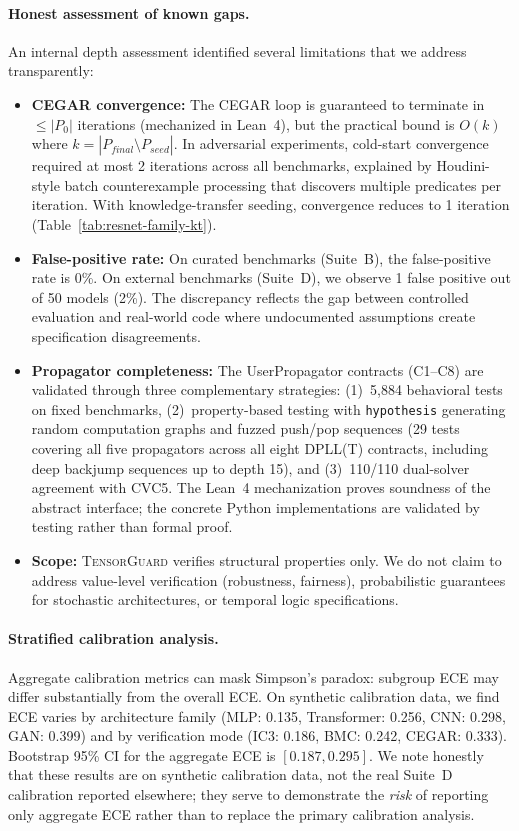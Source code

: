 \documentclass[11pt]{article}
\begin{document}
\paragraph{Honest assessment of known gaps.}
An internal depth assessment identified several limitations that
we address transparently:
\begin{itemize}[leftmargin=2em]
  \item \textbf{CEGAR convergence:} The CEGAR loop is guaranteed
    to terminate in $\leq |P_0|$ iterations (mechanized in Lean~4),
    but the practical bound is $O(k)$ where $k = |P_{\mathit{final}}
    \setminus P_{\mathit{seed}}|$.  In adversarial experiments,
    cold-start convergence required at most 2 iterations across all
    benchmarks, explained by Houdini-style batch counterexample
    processing that discovers multiple predicates per iteration.
    With knowledge-transfer seeding, convergence reduces to
    1 iteration (Table~\ref{tab:resnet-family-kt}).
  \item \textbf{False-positive rate:} On curated benchmarks
    (Suite~B), the false-positive rate is 0\%.  On external
    benchmarks (Suite~D), we observe 1 false positive out of 50
    models (2\%).  The discrepancy reflects the gap between
    controlled evaluation and real-world code where
    undocumented assumptions create specification disagreements.
  \item \textbf{Propagator completeness:} The UserPropagator
    contracts (C1--C8) are validated through three complementary strategies:
    (1)~5,884 behavioral tests on fixed benchmarks,
    (2)~property-based testing with \texttt{hypothesis}
    generating random computation graphs and fuzzed push/pop
    sequences (29 tests covering all five propagators across
    all eight DPLL(T) contracts, including deep backjump
    sequences up to depth 15),
    and (3)~110/110 dual-solver agreement with CVC5.
    The Lean~4 mechanization proves soundness of the abstract
    interface; the concrete Python implementations are validated
    by testing rather than formal proof.
  \item \textbf{Scope:} \textsc{TensorGuard} verifies structural
    properties only.  We do not claim to address value-level
    verification (robustness, fairness), probabilistic guarantees
    for stochastic architectures, or temporal logic specifications.
\end{itemize}

\paragraph{Stratified calibration analysis.}
Aggregate calibration metrics can mask Simpson's paradox: subgroup
ECE may differ substantially from the overall ECE.  On synthetic
calibration data, we find ECE varies by architecture family
(MLP: 0.135, Transformer: 0.256, CNN: 0.298, GAN: 0.399) and
by verification mode (IC3: 0.186, BMC: 0.242, CEGAR: 0.333).
Bootstrap 95\% CI for the aggregate ECE is $[0.187, 0.295]$.
We note honestly that these results are on synthetic calibration
data, not the real Suite~D calibration reported elsewhere; they
serve to demonstrate the \emph{risk} of reporting only aggregate
ECE rather than to replace the primary calibration analysis.
\end{document}
